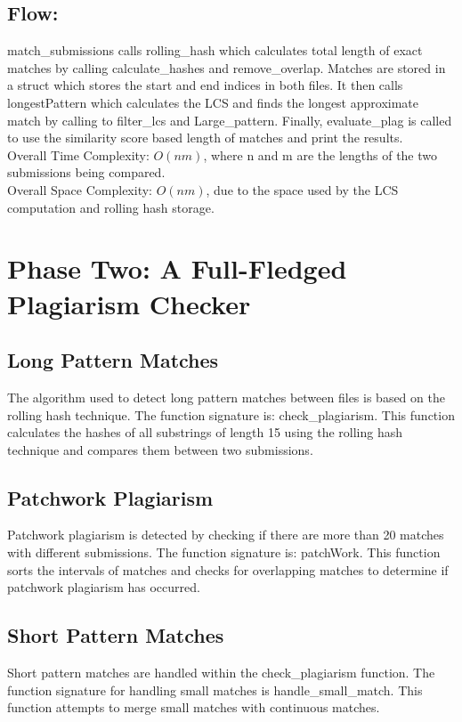 \documentclass{article}
\begin{document}
\subsection{Flow:}
match\_submissions calls rolling\_hash which calculates total length of exact matches by calling calculate\_hashes and remove\_overlap. Matches are stored in a struct which stores the start and end indices in both files. It then calls longestPattern which calculates the LCS and finds the longest approximate match by calling to filter\_lcs and Large\_pattern. Finally, evaluate\_plag is called to use the similarity score based length of matches and print the results.\\
Overall Time Complexity: $O(nm)$, where n and m are the lengths of the two submissions being compared. 
\\
Overall Space Complexity: $O(nm)$, due to the space used by the LCS computation and rolling hash storage.

\section{Phase Two: A Full-Fledged Plagiarism Checker}

\subsection{Long Pattern Matches}
The algorithm used to detect long pattern matches between files is based on the rolling hash technique. The function signature is: check\_plagiarism.
This function calculates the hashes of all substrings of length 15 using the rolling hash technique and compares them between two submissions.

\subsection{Patchwork Plagiarism}
Patchwork plagiarism is detected by checking if there are more than 20 matches with different submissions. The function signature is: patchWork.
This function sorts the intervals of matches and checks for overlapping matches to determine if patchwork plagiarism has occurred.

\subsection{Short Pattern Matches}
Short pattern matches are handled within the check\_plagiarism function. The function signature for handling small matches is handle\_small\_match.
This function attempts to merge small matches with continuous matches.
\end{document}
